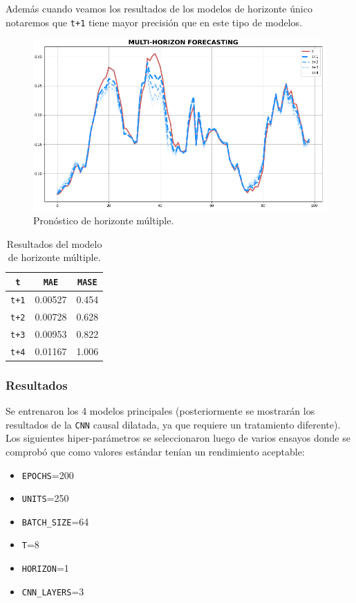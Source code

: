 \documentclass[a4paper,12pt]{article}
\begin{document}
Además cuando veamos los resultados de los modelos de horizonte único notaremos que \texttt{t+1} tiene mayor precisión que en este tipo de modelos.

\begin{figure}[H]
	\begin{center}
	\includegraphics[width=1\textwidth]{multi-horizon-plot.png}
  	\caption{Pronóstico de horizonte múltiple.}
  	\label{fig:multihorizon_plot}
  	\end{center}
\end{figure}

\begin{table}[H]
\centering
\begin{tabular}{ccc}
\hline
\texttt{t} & \texttt{MAE} & \texttt{MASE} \\ \hline
\texttt{t+1}        & 0.00527     & 0.454      \\
\texttt{t+2}        & 0.00728     & 0.628      \\
\texttt{t+3}        & 0.00953     & 0.822      \\
\texttt{t+4}        & 0.01167     & 1.006      \\ \hline
\end{tabular}
\caption{Resultados del modelo de horizonte múltiple.}
\label{tab:multi-horizon-results}
\end{table}

\subsubsection{Resultados}
Se entrenaron los 4 modelos principales (posteriormente se mostrarán los resultados de la \texttt{CNN} causal dilatada, ya que requiere un tratamiento diferente). Los siguientes hiper-parámetros se seleccionaron luego de varios ensayos donde se comprobó que como valores estándar tenían un rendimiento aceptable:
\begin{itemize}[noitemsep, topsep=2pt]
	\item \texttt{EPOCHS}=200
	\item \texttt{UNITS}=250
	\item \texttt{BATCH\_SIZE}=64
	\item \texttt{T}=8
	\item \texttt{HORIZON}=1
	\item \texttt{CNN\_LAYERS}=3
\end{itemize}
\end{document}
